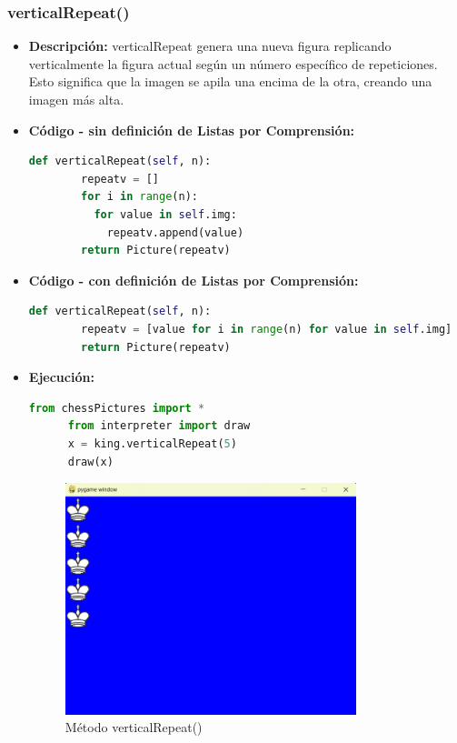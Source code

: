 \documentclass{article}
\begin{document}
  \subsubsection{verticalRepeat()}
  \begin{itemize}
    \item \textbf{Descripción: }verticalRepeat genera una nueva figura replicando verticalmente la figura actual según un número específico de repeticiones. 
      Esto significa que la imagen se apila una encima de la otra, creando una imagen más alta.
    \newpage
    \item \textbf{Código - sin definición de Listas por Comprensión:}
    \begin{lstlisting}[language=Python, caption=Método verticalRepeat()]
      def verticalRepeat(self, n):
        repeatv = []
        for i in range(n):
          for value in self.img:
            repeatv.append(value)
        return Picture(repeatv)
    \end{lstlisting}
    \item \textbf{Código - con definición de Listas por Comprensión:}
    \begin{lstlisting}[language=Python, caption=Método verticalRepeat()]
      def verticalRepeat(self, n):
        repeatv = [value for i in range(n) for value in self.img]
        return Picture(repeatv)
    \end{lstlisting}
    \item \textbf{Ejecución:}
    \begin{lstlisting}[language=Python, caption=Prueba verticalRepeat()]
      from chessPictures import *
      from interpreter import draw
      x = king.verticalRepeat(5)
      draw(x)
    \end{lstlisting}
    \begin{figure}[H]
      \centering
      \includegraphics[width=0.8\textwidth, keepaspectratio]{img/repeatv.png}
      \caption{Método verticalRepeat()}
    \end{figure}
  \end{itemize}
  \newpage
  
\end{document}
